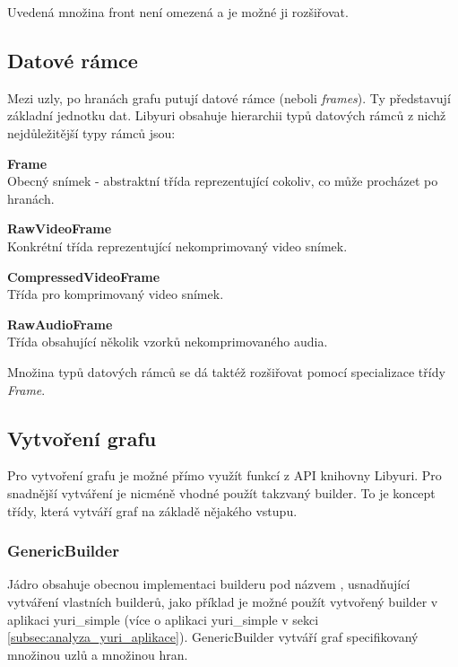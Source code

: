 \documentclass[thesis=M,czech]{FITthesis}[2012/06/26]
\begin{document}
Uvedená množina front není omezená a je možné ji rozšiřovat.

\subsection{Datové rámce} \label{subsec:analyza_yuri_ramce}
Mezi uzly, po hranách grafu putují datové rámce (neboli \textit{frames}). Ty představují základní jednotku dat. Libyuri obsahuje hierarchii typů datových rámců z nichž nejdůležitější typy rámců jsou:
\begin{description}
  \item \textbf{Frame\\}
Obecný snímek - abstraktní třída reprezentující cokoliv, co může procházet po hranách.
  \item \textbf{RawVideoFrame\\}
Konkrétní třída reprezentující nekomprimovaný video snímek. 
  \item \textbf{CompressedVideoFrame \\}
Třída pro komprimovaný video snímek.
  \item \textbf{RawAudioFrame\\}
Třída obsahující několik vzorků nekomprimovaného audia.
\end{description}

Množina typů datových rámců se dá taktéž rozšiřovat pomocí specializace třídy \textit{Frame}.

\subsection{Vytvoření grafu} \label{subsec:analyza_yuri_vytvoreni}
Pro vytvoření grafu je možné přímo využít funkcí z API knihovny Libyuri. Pro snadnější vytváření je nicméně vhodné použít takzvaný builder. To je koncept třídy, která vytváří graf na základě nějakého vstupu. 

\subsubsection{GenericBuilder} \label{subsec:analyza_yuri_vytvoreni_generic}
Jádro obsahuje obecnou implementaci builderu pod názvem , usnadňující vytváření vlastních builderů, jako příklad je možné použít vytvořený builder  v aplikaci yuri\_simple (více o aplikaci yuri\_simple v sekci \ref{subsec:analyza_yuri_aplikace}). GenericBuilder vytváří graf specifikovaný množinou uzlů a množinou hran.
\end{document}
